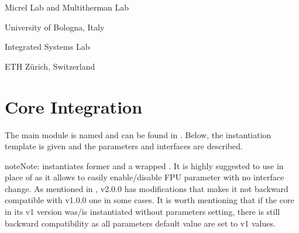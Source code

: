 \documentclass[letterpaper,10pt,english]{sphinxmanual}
\begin{document}
\begin{DUlineblock}{0em}
\item[] Micrel Lab and Multitherman Lab
\item[] University of Bologna, Italy
\end{DUlineblock}

\begin{DUlineblock}{0em}
\item[] Integrated Systems Lab
\item[] ETH Zürich, Switzerland
\end{DUlineblock}

\sphinxstepscope


\chapter{Core Integration}
\label{\detokenize{integration:core-integration}}\label{\detokenize{integration:id1}}\label{\detokenize{integration::doc}}
\sphinxAtStartPar
The main module is named  and can be found in .
Below, the instantiation template is given and the parameters and interfaces are described.

\begin{sphinxadmonition}{note}{Note:}
\sphinxAtStartPar
{} instantiates former  and a wrapped .
It is highly suggested to use  in place of  as
it allows to easily enable/disable FPU parameter with no interface change.
As mentioned in {\hyperref[\detokenize{core_versions:backward-compatibility}]{}}, v2.0.0  has 
modifications that makes it not backward compatible with v1.0.0 one in some cases.
It is worth mentioning that if the core in its v1 version was/is instantiated without parameters setting,
there is still backward compatibility as all parameters default value are set to v1 values.
\end{sphinxadmonition}
\end{document}
